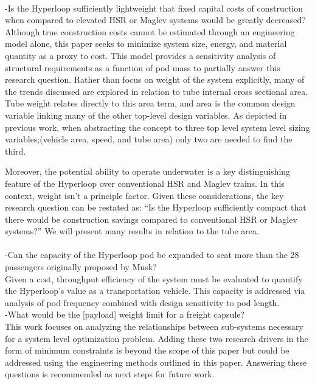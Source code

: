 	\\
	-Is the Hyperloop sufficiently lightweight that fixed capital costs of construction
	when compared to elevated HSR or Maglev systems would be greatly decreased?\\

	Although true construction costs cannot be estimated through an engineering
	model alone, this paper seeks to minimize system size, energy, and material
	quantity as a proxy to cost. This model provides a sensitivity
	analysis of structural requirements as a function of pod mass to partially
	answer this research question. Rather than focus on weight of the system explicitly,
	many of the trends discussed are explored in relation to tube internal
	cross sectional area. Tube weight relates directly to this area term, and
	area is the common design variable linking many of the other top-level
	design variables. As depicted in previous work,
	\cite{Chin} when abstracting the concept to three top level system level
	sizing variables;(vehicle area, speed, and tube area) only two are needed
	to find the third.

	Moreover, the potential ability to operate underwater is a key distinguishing feature
	of the Hyperloop over conventional HSR and Maglev trains. In this context,
	weight isn't a principle factor. Given these considerations, the key research
	question can be restated as: ``Is the Hyperloop sufficiently compact that
	there would be construction savings compared to conventional
	HSR or Maglev systems?'' We will present many results in relation to the tube area.\\
	\\
	-Can the capacity of the Hyperloop pod be expanded to seat more than the 28
	passengers originally proposed by Musk?\\

	Given a cost, throughput efficiency of the system must be evaluated to quantify the
	Hyperloop's value as a transportation vehicle. This capacity is addressed
	via analysis of pod frequency combined with design sensitivity to pod length.\\

	-What would be the [payload] weight limit for a freight capsule?\\

	This work focuses on analyzing the relationships between sub-systems
	necessary for a system level optimization problem. Adding these two research
	drivers in the form of minimum constraints is beyond the scope of this paper
	but could be addressed using the engineering methods outlined in this paper.
	Answering these questions is recommended as next steps for future work.\\


